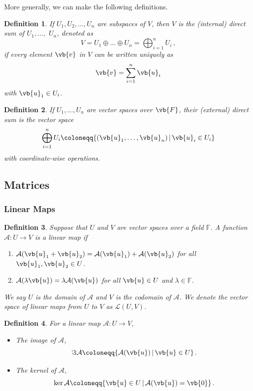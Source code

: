 \documentclass{article}
\theoremstyle{plain}\theoremheaderfont{\normalfont\itshape}\theorembodyfont{\rmfamily}\theoremseparator{.}\newtheorem*{rem}{Remark}\newtheorem*{ex}{Example}\newtheorem*{proof}{Proof}\newtheorem*{altp}{Alternative proof}
\theoremstyle{plain}\theoremheaderfont{\normalfont\bfseries}\theorembodyfont{\rmfamily}\theoremseparator{.}\newtheorem{thm}{Theorem}[section]\newtheorem{lem}[thm]{Lemma}\newtheorem{prop}[thm]{Proposition}\newtheorem*{cor}{Corollary}\newtheorem{defn}[thm]{Definition}\newtheorem{clm}[thm]{Claim}\newtheorem{clminproof}{Claim}
\theoremstyle{break}\theoremheaderfont{\normalfont\itshape}\theorembodyfont{\rmfamily}\theoremseparator{.\medskip}\newtheorem*{proofskip}{Proof}\newtheorem*{exs}{Examples}\newtheorem*{rems}{Remarks}
\theoremstyle{break}\theoremheaderfont{\normalfont\bfseries}\theorembodyfont{\rmfamily}\theoremseparator{.\medskip}\newtheorem{lemskip}[thm]{Lemma}\newtheorem{defnskip}[thm]{Definition}\newtheorem{propskip}[thm]{Proposition}\newtheorem{thmskip}[thm]{Theorem}
\numberwithin{equation}{section}
\begin{document}
	More generally, we can make the following definitions.

	\begin{defn}
		If \(U_1, U_2,\dots, U_n\) are subspaces of \(V\), then \(V\) is the \textit{(internal) direct sum} of \(U_1,\dots,\) \(U_n\), denoted as
		\[V=U_1\oplus\dots\oplus U_n =\bigoplus_{i=1}^{n}U_i\,,\]
		if every element \(\vb{v}\) in \(V\) can be written uniquely as
		\[\vb{v}=\sum_{i=1}^{n}\vb{u}_i\]
		with \(\vb{u}_1\in U_i\).
	\end{defn}
	\begin{defn}
		If \(U_1,\dots,U_n\) are vector spaces over \(\vb{F}\), their \textit{(external) direct sum} is the vector space
		\[\bigoplus_{i=1}^{n}U_i\coloneqq\{(\vb{u}_1,\dots,\vb{u}_n)\,|\,\vb{u}_i\in U_i\}\]
		with coordinate-wise operations.
	\end{defn}

	\subsection{Matrices}
	\subsubsection{Linear Maps}
	\begin{defn}
		Suppose that \(U\) and \(V\) are vector spaces over a field \(\mathbb{F}\). A function
		\(\mathcal{A}: U\to V\) is a \textit{linear map} if
		\begin{enumerate}[topsep=0pt]
			\item[(i)] \(\mathcal{A}(\vb{u}_1+\vb{u}_2)=\mathcal{A}(\vb{u}_1)+\mathcal{A}(\vb{u}_2)\) for all \(\vb{u}_1,\vb{u}_2\in U\).
			\item[(ii)] \(\mathcal{A}(\lambda\vb{u})=\lambda\mathcal{A}(\vb{u})\) for all \(\vb{u}\in U\) and \(\lambda\in\mathbb{F}\).
		\end{enumerate}
		We say \(U\) is the \textit{domain} of \(\mathcal{A}\) and \(V\) is the \textit{codomain} of \(\mathcal{A}\). We denote the vector space of linear maps from \(U\) to \(V\) as \(\mathcal{L}(U,V)\).
	\end{defn}

	\begin{defn}
		For a linear map \(\mathcal{A}:U\to V\),
		\begin{itemize}[topsep=0pt]
			\item The \textit{image} of \(\mathcal{A}\),
			\[\Im\mathcal{A}\coloneqq\{\mathcal{A}(\vb{u})\,|\,\vb{u}\in U\}\,.\]
			\item The \textit{kernel} of \(\mathcal{A}\),
			\[\ker\mathcal{A}\coloneqq\{\vb{u}\in U\,|\,\mathcal{A}(\vb{u})=\vb{0}\}\,.\]
		\end{itemize}
	\end{defn}
	
\end{document}
